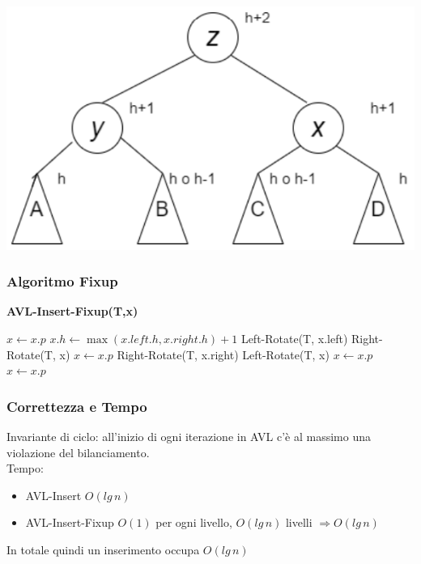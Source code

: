 \documentclass[a4paper,12pt]{article}
\begin{document}
\begin{minipage}{0.38\textwidth}
    \includegraphics[width=\linewidth]{rotazione 2.3.png}
\end{minipage}

\subsubsection{Algoritmo Fixup}
\textbf{AVL-Insert-Fixup(T,x)}
\begin{algorithmic}[1]
\State $x \leftarrow x.p$
    \State $x.h \leftarrow \max(x.left.h, x.right.h) + 1$
     
         
            \State Left-Rotate(T, x.left)
        \EndIf
        \State Right-Rotate(T, x)
        \State $x \leftarrow x.p$ 
     
         
            \State Right-Rotate(T, x.right)
        \EndIf
        \State Left-Rotate(T, x)
        \State $x \leftarrow x.p$ 
    \EndIf
    \State $x \leftarrow x.p$
\EndWhile
\end{algorithmic}

\subsubsection{Correttezza e Tempo}
Invariante di ciclo: all'inizio di ogni iterazione in AVL c'è al massimo una violazione del bilanciamento.\\
Tempo: 
\begin{itemize}
    \item AVL-Insert $O(lg \, n)$
    \item AVL-Insert-Fixup $O(1)$ per ogni livello, $O(lg \, n)$ livelli $\Rightarrow O(lg \, n)$
\end{itemize}
In totale quindi un inserimento occupa $O(lg \, n)$
\end{document}
